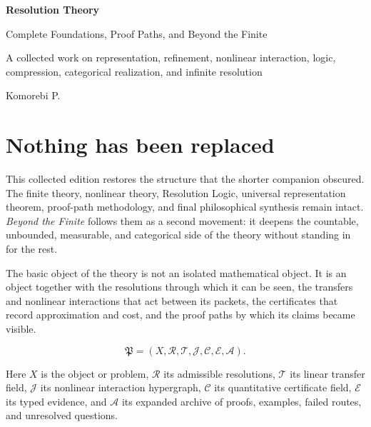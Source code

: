 \documentclass[11pt]{article}
\begin{document}
\thispagestyle{empty}
\begin{center}
\vspace*{1.0in}
{\fontsize{30}{34}\selectfont\bfseries Resolution Theory\par}
\vspace{0.22in}
{\Large Complete Foundations, Proof Paths, and Beyond the Finite\par}
\vspace{0.30in}
{\large A collected work on representation, refinement, nonlinear interaction, logic, compression, categorical realization, and infinite resolution\par}
\vfill
{\Large Komorebi P.\par}
\vspace{0.75in}
\end{center}
\clearpage

\section*{Nothing has been replaced}
This collected edition restores the structure that the shorter companion obscured.  The finite theory, nonlinear theory, Resolution Logic, universal representation theorem, proof-path methodology, and final philosophical synthesis remain intact.  \emph{Beyond the Finite} follows them as a second movement: it deepens the countable, unbounded, measurable, and categorical side of the theory without standing in for the rest.

The basic object of the theory is not an isolated mathematical object.  It is an object together with the resolutions through which it can be seen, the transfers and nonlinear interactions that act between its packets, the certificates that record approximation and cost, and the proof paths by which its claims became visible.

\[
\mathfrak P
=
(X,\mathcal R,\mathcal T,\mathcal J,\mathcal C,\mathcal E,\mathcal A).
\]

Here $X$ is the object or problem, $\mathcal R$ its admissible resolutions, $\mathcal T$ its linear transfer field, $\mathcal J$ its nonlinear interaction hypergraph, $\mathcal C$ its quantitative certificate field, $\mathcal E$ its typed evidence, and $\mathcal A$ its expanded archive of proofs, examples, failed routes, and unresolved questions.
\end{document}
